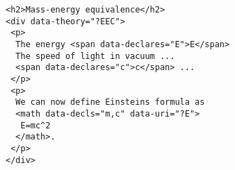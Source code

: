 \begin{lstlisting}
<h2>Mass-energy equivalence</h2>
<div data-theory="?EEC">
 <p>
  The energy <span data-declares="E">E</span>
  The speed of light in vacuum ... 
  <span data-declares="c">c</span> ...
 </p>
 <p>
  We can now define Einsteins formula as 
  <math data-decls="m,c" data-uri="?E">
   E=mc^2
  </math>. 
 </p>
</div>
\end{lstlisting}